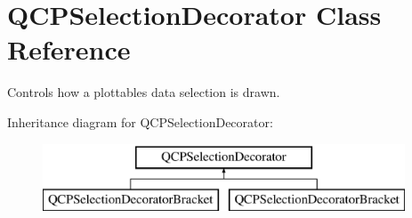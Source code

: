 \hypertarget{class_q_c_p_selection_decorator}{}\section{Q\+C\+P\+Selection\+Decorator Class Reference}
\label{class_q_c_p_selection_decorator}


Controls how a plottable\textquotesingle{}s data selection is drawn.  


Inheritance diagram for Q\+C\+P\+Selection\+Decorator\+:\begin{figure}[H]
\begin{center}
\leavevmode
\includegraphics[height=2.000000cm]{class_q_c_p_selection_decorator}
\end{center}
\end{figure}
